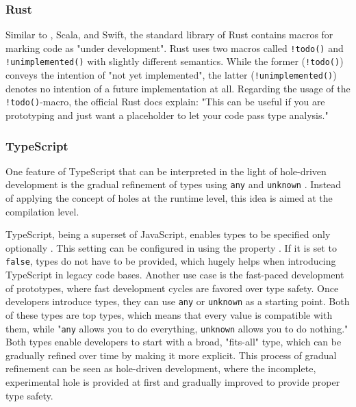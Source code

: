 \subsubsection{Rust}
Similar to \CS, Scala, and Swift, the standard library of Rust contains macros for marking code as "under development".
Rust uses two macros called \texttt{!todo()} \cite{the_rust_project_developers_todo_2023} and \texttt{!unimplemented()} \cite{the_rust_project_developers_unimplemented_2023} with slightly different semantics.
While the former (\texttt{!todo()}) conveys the intention of "not yet implemented", the latter (\texttt{!unimplemented()}) denotes no intention of a future implementation at all.
Regarding the usage of the \texttt{!todo()}-macro, the official Rust docs explain: "This can be useful if you are prototyping and just want a placeholder to let your code pass type analysis." \cite{the_rust_project_developers_todo_2023}

\subsubsection{TypeScript}
One feature of TypeScript that can be interpreted in the light of hole-driven development is the gradual refinement of types using \texttt{any} and \texttt{unknown} \cite{baumgartner_typescript_2023}.
Instead of applying the concept of holes at the runtime level, this idea is aimed at the compilation level.

TypeScript, being a superset of JavaScript, enables types to be specified only optionally \cite{baumgartner_typescript_2023}.
This setting can be configured in \texttt{} using the property \texttt{}.
If it is set to \texttt{false}, types do not have to be provided, which hugely helps when introducing TypeScript in legacy code bases.
Another use case is the fast-paced development of prototypes, where fast development cycles are favored over type safety.
Once developers introduce types, they can use \texttt{any} or \texttt{unknown} as a starting point.
Both of these types are top types, which means that every value is compatible with them, while "\texttt{any} allows you to do everything, \texttt{unknown} allows you to do nothing." \cite{baumgartner_typescript_2023}
Both types enable developers to start with a broad, "fits-all" type, which can be gradually refined over time by making it more explicit.
This process of gradual refinement can be seen as hole-driven development, where the incomplete, experimental hole is provided at first and gradually improved to provide proper type safety.

